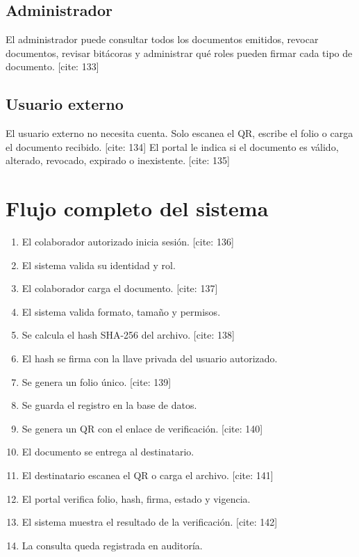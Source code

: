 \documentclass[10pt]{article} [cite: 1]
\begin{document}
\subsection{Administrador}

El administrador puede consultar todos los documentos emitidos, revocar documentos, revisar bitácoras y administrar qué roles pueden firmar cada tipo de documento. [cite: 133]

\subsection{Usuario externo}

El usuario externo no necesita cuenta. Solo escanea el QR, escribe el folio o carga el documento recibido. [cite: 134] El portal le indica si el documento es válido, alterado, revocado, expirado o inexistente. [cite: 135]

\section{Flujo completo del sistema}

\begin{enumerate}
    \item El colaborador autorizado inicia sesión. [cite: 136]
    \item El sistema valida su identidad y rol.
    \item El colaborador carga el documento. [cite: 137]
    \item El sistema valida formato, tamaño y permisos.
    \item Se calcula el hash SHA-256 del archivo. [cite: 138]
    \item El hash se firma con la llave privada del usuario autorizado.
    \item Se genera un folio único. [cite: 139]
    \item Se guarda el registro en la base de datos.
    \item Se genera un QR con el enlace de verificación. [cite: 140]
    \item El documento se entrega al destinatario.
    \item El destinatario escanea el QR o carga el archivo. [cite: 141]
    \item El portal verifica folio, hash, firma, estado y vigencia.
    \item El sistema muestra el resultado de la verificación. [cite: 142]
    \item La consulta queda registrada en auditoría.
\end{enumerate}
\end{document}
